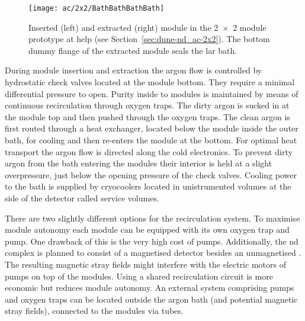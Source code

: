 \begin{figure}[tbp]
	\centering
	\texttt{[image: ac/2x2/BathBathBathBath]}
	\caption[\AC{} module insertion and extraction]{%
		Inserted (left) and extracted (right) \AC{} module in the \num{2 x 2} module prototype at \acrshort{help} (see Section~\ref{sec:dune-nd_ac-2x2}).
		The bottom dummy flange of the extracted module seals the \acrshort{lar} bath.
	}
	\label{fig:ac_module-ins-ext}
\end{figure}

During module insertion and extraction the argon flow is controlled by hydrostatic check valves located at the module bottom.
They require a minimal differential pressure to open.
Purity inside to modules is maintained by means of continuous \lar{} recirculation through oxygen traps.
The dirty argon is sucked in at the module top and then pushed through the oxygen traps.
The clean argon is first routed through a heat exchanger, located below the module inside the outer bath, for cooling and then re-enters the module at the bottom.
For optimal heat transport the argon flow is directed along the cold electronics.
To prevent dirty argon from the bath entering the modules their interior is held at a slight overpressure, just below the opening pressure of the check valves.
Cooling power to the bath is supplied by cryocoolers located in unistrumented volumes at the side of the detector called service volumes.

There are two slightly different options for the recirculation system.
To maximise module autonomy each module can be equipped with its own oxygen trap and \lar{} pump.
One drawback of this is the very high cost of \lar{} pumps.
Additionally, the \dune{} \gls{nd} complex is planned to consist of a magnetised detector besides an unmagnetised \lartpc{}.
The resulting magnetic stray fields might interfere with the electric motors of \lar{} pumps on top of the modules.
Using a shared recirculation circuit is more economic but reduces module autonomy.
An external system comprising pumps and oxygen traps can be located outside the argon bath (and potential magnetic stray fields), connected to the modules via tubes.

